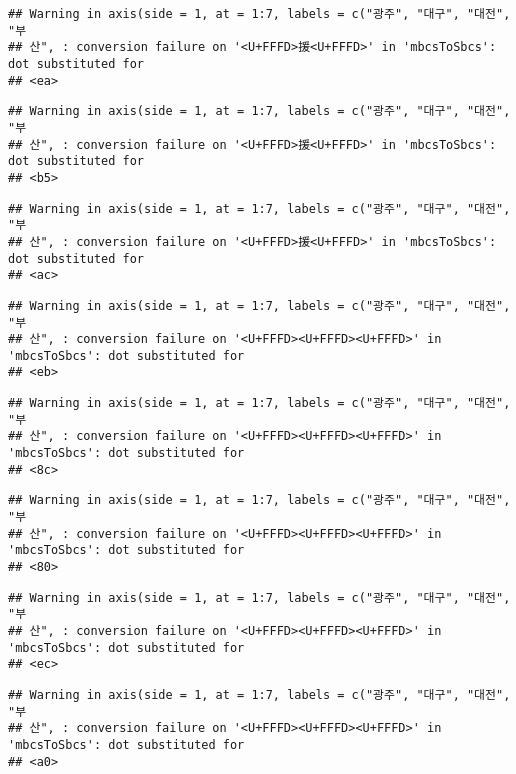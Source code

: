 \documentclass[]{article}
\begin{document}
\begin{verbatim}
## Warning in axis(side = 1, at = 1:7, labels = c("광주", "대구", "대전", "부
## 산", : conversion failure on '<U+FFFD>援<U+FFFD>' in 'mbcsToSbcs': dot substituted for
## <ea>
\end{verbatim}

\begin{verbatim}
## Warning in axis(side = 1, at = 1:7, labels = c("광주", "대구", "대전", "부
## 산", : conversion failure on '<U+FFFD>援<U+FFFD>' in 'mbcsToSbcs': dot substituted for
## <b5>
\end{verbatim}

\begin{verbatim}
## Warning in axis(side = 1, at = 1:7, labels = c("광주", "대구", "대전", "부
## 산", : conversion failure on '<U+FFFD>援<U+FFFD>' in 'mbcsToSbcs': dot substituted for
## <ac>
\end{verbatim}

\begin{verbatim}
## Warning in axis(side = 1, at = 1:7, labels = c("광주", "대구", "대전", "부
## 산", : conversion failure on '<U+FFFD><U+FFFD><U+FFFD>' in 'mbcsToSbcs': dot substituted for
## <eb>
\end{verbatim}

\begin{verbatim}
## Warning in axis(side = 1, at = 1:7, labels = c("광주", "대구", "대전", "부
## 산", : conversion failure on '<U+FFFD><U+FFFD><U+FFFD>' in 'mbcsToSbcs': dot substituted for
## <8c>
\end{verbatim}

\begin{verbatim}
## Warning in axis(side = 1, at = 1:7, labels = c("광주", "대구", "대전", "부
## 산", : conversion failure on '<U+FFFD><U+FFFD><U+FFFD>' in 'mbcsToSbcs': dot substituted for
## <80>
\end{verbatim}

\begin{verbatim}
## Warning in axis(side = 1, at = 1:7, labels = c("광주", "대구", "대전", "부
## 산", : conversion failure on '<U+FFFD><U+FFFD><U+FFFD>' in 'mbcsToSbcs': dot substituted for
## <ec>
\end{verbatim}

\begin{verbatim}
## Warning in axis(side = 1, at = 1:7, labels = c("광주", "대구", "대전", "부
## 산", : conversion failure on '<U+FFFD><U+FFFD><U+FFFD>' in 'mbcsToSbcs': dot substituted for
## <a0>
\end{verbatim}
\end{document}
